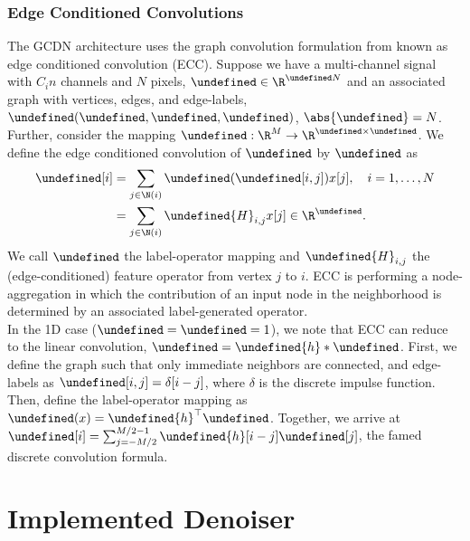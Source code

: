 \documentclass[12pt,a4paper,reqno]{amsart}
\let\bm\undefined
\newcommand{\bm}[1]{\mathbf{#1}}
\let\x\undefined
\newcommand{\x}{\bm{x}}
\let\y\undefined
\newcommand{\y}{\bm{y}}
\let\Cin\undefined
\newcommand{\Cin}{C_{\mathrm{in}}}
\let\Cout\undefined
\newcommand{\Cout}{C_{\mathrm{out}}}
\let\G\undefined
\newcommand{\G}{\mathcal{G}}
\let\V\undefined
\newcommand{\V}{\mathcal{V}}
\let\E\undefined
\newcommand{\E}{\mathcal{E}}
\let\L\undefined
\newcommand{\L}{\mathcal{L}}
\let\F\undefined
\newcommand{\F}{\mathcal{F}}
\begin{document}
\subsubsection{Edge Conditioned Convolutions}
The GCDN architecture uses the graph convolution formulation from
\cite{Simonovsky2017ecc} known as edge conditioned convolution (ECC). Suppose we
have a multi-channel signal with $C_in$ channels and $N$ pixels, $\x \in
\R^{\Cin N}$ and an associated graph with vertices, edges, and edge-labels,
$\G(\V,\E,\L)$, $\abs{\V}=N$. Further, consider the mapping $\F:\R^M \rightarrow
\R^{\Cout \times \Cin}$. We define the edge conditioned convolution of $\x$ by
$\F$ as 
\begin{align}
\y[i] &= \sum_{j \in \N(i)} \F(\L[i,j])x[j], \quad i=1,\dots,N \\
      &= \sum_{j \in \N(i)} \bm{H}_{i,j}x[j] \in \R^{\Cout}. \nonumber
\end{align}
We call $\F$ the label-operator mapping and $\bm{H}_{i,j}$ the
(edge-conditioned) feature operator from vertex $j$ to $i$. ECC is performing a
node-aggregation in which the contribution of an
input node in the neighborhood is determined by an associated label-generated
operator. \\

In the 1D case ($\Cin = \Cout = 1$), we note that ECC can reduce to the
linear convolution, $\y = \bm{h} \ast \x$. First, we define the graph such that only
immediate neighbors are connected, and edge-labels as
$\L[i,j] = \delta[i-j]$, where $\delta$ is the discrete impulse function. Then, 
define the label-operator mapping as $\F(x) = \bm{h}^\top \x$. Together, we
arrive at $\y[i] = \sum_{j=-M/2}^{M/2-1} \bm{h}[i-j]\x[j]$, the famed discrete
convolution formula.



\section{Implemented Denoiser} \label{sec:implementation}
\end{document}

